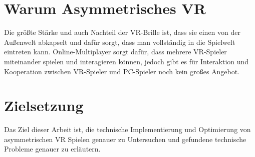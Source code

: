 \section{Warum Asymmetrisches VR}
Die größte Stärke und auch Nachteil der VR-Brille ist, dass sie einen von der Außenwelt abkapselt und dafür sorgt, dass man vollständig in die Spielwelt eintreten kann. Online-Multiplayer sorgt dafür, dass mehrere VR-Spieler miteinander spielen und interagieren können, jedoch gibt es für Interaktion und Kooperation zwischen VR-Spieler und PC-Spieler noch kein großes Angebot.

\section{Zielsetzung}
Das Ziel dieser Arbeit ist, die technische Implementierung und Optimierung von asymmetrischen VR Spielen genauer zu Untersuchen und gefundene technische Probleme genauer zu erläutern.

